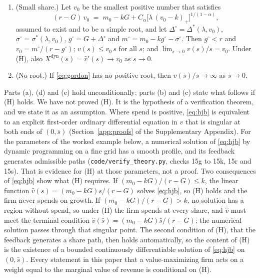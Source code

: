 \begin{proposition}
\begin{enumerate}
\item[(d)] (Small share.) Let $v_0$ be the smallest positive number that satisfies
\begin{equation}\label{eq:gordon}
(r-G)\,v_0\;=\;m_0-kG+C_\alpha\bigl[\lambda\,(v_0-k)_+\bigr]^{1/(1-\alpha)},
\end{equation}
assumed to exist and to be a simple root, and let $\Delta^\circ=\Delta^*(\lambda,v_0)$, $\sigma^\circ=\sigma^*(\lambda,v_0)$, $g^\circ=G+\Delta^\circ$ and $m^\circ=m_0-kg^\circ-\sigma^\circ$. Then $g^\circ<r$ and $v_0=m^\circ/(r-g^\circ)$; $v(s)\le v_0\,s$ for all $s$; and $\lim_{s\to 0}v(s)/s=v_0$. Under (H), also $X^{\mathrm{dyn}}(s)=\hat v'(s)\to v_0$ as $s\to 0$.
\item[(e)] (No root.) If \eqref{eq:gordon} has no positive root, then $v(s)/s\to\infty$ as $s\to 0$.
\end{enumerate}
\end{proposition}

Parts (a), (d) and (e) hold unconditionally; parts (b) and (c) state what follows if (H) holds. We have not proved (H). It is the hypothesis of a verification theorem, and we state it as an assumption. Where spend is positive, \eqref{eq:hjb} is equivalent to an explicit first-order ordinary differential equation in $v$ that is singular at both ends of $(0,\bar s)$ (Section~\ref{app:proofs} of the Supplementary Appendix). For the parameters of the worked example below, a numerical solution of \eqref{eq:hjb} by dynamic programming on a fine grid has a smooth profile, and its feedback generates admissible paths (\texttt{code/verify\_theory.py}, checks 15g to 15k, 15r and 15s). That is evidence for (H) at those parameters, not a proof. Two consequences of \eqref{eq:hjb} show what (H) requires. If $(m_0-kG)/(r-G)\le k$, the linear function $\hat v(s)=(m_0-kG)s/(r-G)$ solves \eqref{eq:hjb}, so (H) holds and the firm never spends on growth. If $(m_0-kG)/(r-G)>k$, no solution has a region without spend, so under (H) the firm spends at every share, and $\hat v$ must meet the terminal condition $\hat v(\bar s)=(m_0-kG)\bar s/(r-G)$; the numerical solution passes through that singular point. The second condition of (H), that the feedback generates a share path, then holds automatically, so the content of (H) is the existence of a bounded continuously differentiable solution of \eqref{eq:hjb} on $(0,\bar s)$. Every statement in this paper that a value-maximizing firm acts on a weight equal to the marginal value of revenue is conditional on (H).

